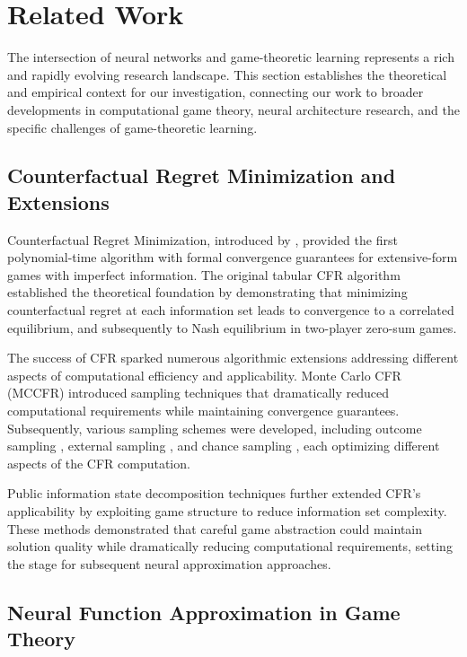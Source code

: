 \documentclass[10pt,twocolumn]{article}
\theoremstyle{definition}
\begin{document}
\section{Related Work}

The intersection of neural networks and game-theoretic learning represents a rich and rapidly evolving research landscape. This section establishes the theoretical and empirical context for our investigation, connecting our work to broader developments in computational game theory, neural architecture research, and the specific challenges of game-theoretic learning.

\subsection{Counterfactual Regret Minimization and Extensions}

Counterfactual Regret Minimization, introduced by \citet{zinkevich2007regret}, provided the first polynomial-time algorithm with formal convergence guarantees for extensive-form games with imperfect information. The original tabular CFR algorithm established the theoretical foundation by demonstrating that minimizing counterfactual regret at each information set leads to convergence to a correlated equilibrium, and subsequently to Nash equilibrium in two-player zero-sum games.

The success of CFR sparked numerous algorithmic extensions addressing different aspects of computational efficiency and applicability. Monte Carlo CFR (MCCFR) \citep{lanctot2009monte} introduced sampling techniques that dramatically reduced computational requirements while maintaining convergence guarantees. Subsequently, various sampling schemes were developed, including outcome sampling \citep{gibson2012efficient}, external sampling \citep{lanctot2013efficient}, and chance sampling \citep{gibson2012efficient}, each optimizing different aspects of the CFR computation.

Public information state decomposition techniques \citep{crowell2019cluster} further extended CFR's applicability by exploiting game structure to reduce information set complexity. These methods demonstrated that careful game abstraction could maintain solution quality while dramatically reducing computational requirements, setting the stage for subsequent neural approximation approaches.

\subsection{Neural Function Approximation in Game Theory}
\end{document}
